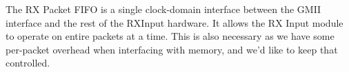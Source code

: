 The RX Packet FIFO is a single clock-domain interface between the GMII
interface and the rest of the RXInput hardware. It allows the RX Input
module to operate on entire packets at a time. This is also necessary
as we have some per-packet overhead when interfacing with memory, and
we'd like to keep that controlled. 
